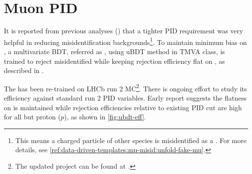 \section{Muon PID}
\label{ref:selection:mu-pid}

It is reported from previous analyses
(\cite{PhysRevLett.115.111803,LHCb-ANA-2020-056}) that a tighter \muon PID
requirement was very helpful in reducing \muon misidentification
backgrounds\footnote{
    This means a charged particle of other species is misidentified as a \muon.
    For more details, see
    \cref{ref:data-driven-templates:mu-misid:unfold-fake-mu}.
}.
To maintain minimum bias on \muon \pt, a multivariate BDT,
referred as \UBDT, using uBDT method in TMVA class,
is trained to reject misidentified \muon while keeping rejection
efficiency flat on \pt,
as described in \cite{LHCb-ANA-2020-056}.

The \UBDT has been re-trained on LHCb run 2 MC\footnote{
    The updated project can be found at
    .
}.
There is ongoing effort to study its efficiency against standard run 2 PID
variables.
Early report suggests the flatness on \pt is maintained while rejection
efficiencies relative to existing PID cut are high for all but proton ($p$),
as shown in \cref{fig:ubdt-eff}.

